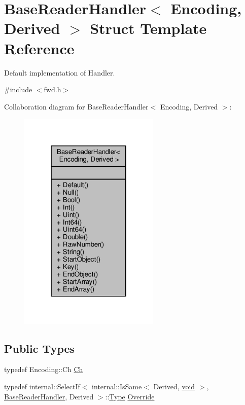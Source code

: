\hypertarget{structBaseReaderHandler}{}\section{Base\+Reader\+Handler$<$ Encoding, Derived $>$ Struct Template Reference}
\label{structBaseReaderHandler}


Default implementation of Handler.  




{\ttfamily \#include $<$fwd.\+h$>$}



Collaboration diagram for Base\+Reader\+Handler$<$ Encoding, Derived $>$\+:
\nopagebreak
\begin{figure}[H]
\begin{center}
\leavevmode
\includegraphics[width=190pt]{structBaseReaderHandler__coll__graph}
\end{center}
\end{figure}
\subsection*{Public Types}
\begin{DoxyCompactItemize}
\item 
typedef Encoding\+::\+Ch \hyperlink{structBaseReaderHandler_a8302c755dd3560c8c5bac99162c28214}{Ch}
\item 
typedef internal\+::\+Select\+If$<$ internal\+::\+Is\+Same$<$ Derived, \hyperlink{imgui__impl__opengl3__loader_8h_ac668e7cffd9e2e9cfee428b9b2f34fa7}{void} $>$, \hyperlink{structBaseReaderHandler}{Base\+Reader\+Handler}, Derived $>$\+::\hyperlink{rapidjson_8h_a1d1cfd8ffb84e947f82999c682b666a7}{Type} \hyperlink{structBaseReaderHandler_a7b6c70d9bf7483b2de5d249f1593776a}{Override}
\end{DoxyCompactItemize}
